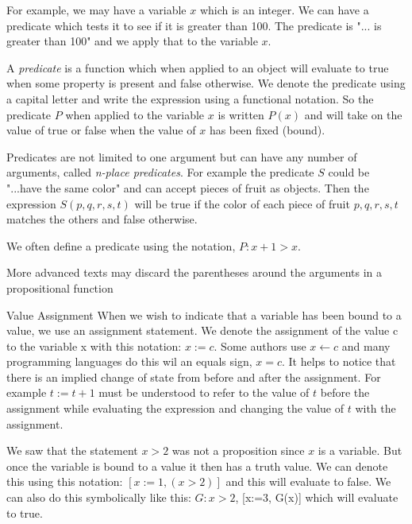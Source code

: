 For example, we may have a variable $x$ which is an integer. We can have a predicate which tests it to see if it is greater than 100. The predicate is "... is greater than 100" and we apply that to the variable $x$.

\begin{definition}[Predicate]
A \textit{predicate} is a function which when applied to an object will evaluate to true when some property is present and false otherwise. We denote the predicate using a capital letter and write the expression using a functional notation. So the predicate $P$ when applied to the variable $x$ is written $P(x)$ and will take on the value of true or false when the value of $x$ has been fixed (bound).

Predicates are not limited to one argument but can have any number of arguments, called \textit{n-place predicates}. For example the predicate $S$ could be "...have the same color" and can accept pieces of fruit as objects. Then the expression $S(p,q,r,s,t)$ will be true if the color of each piece of fruit $p,q,r,s,t$ matches the others and false otherwise.

We often define a predicate using the notation, $P: x+1 > x$.
\end{definition}

\begin{notes}
More advanced texts may discard the parentheses around the arguments in a propositional function
\end{notes}

\begin{definition}{Value Assignment}
When we wish to indicate that a variable has been bound to a value, we use an assignment statement. We denote the assignment of the value c to the variable x with this notation: $x := c$. Some authors use $x\leftarrow c$ and many programming languages do this wil an equals sign, $x=c$. It helps to notice that there is an implied change of state from before and after the assignment. For example $t:=t+1$ must be understood to refer to the value of $t$ before the assignment while evaluating the expression and changing the value of $t$ with the assignment.
\end{definition}

We saw that the statement $x>2$ was not a proposition since $x$ is a variable. But once the variable is bound to a value it then has a truth value. We can denote this using this notation:
$[x:=1, (x>2)]$ and this will evaluate to false. We can also do this symbolically like this: $G:x>2$, [x:=3, G(x)] which will evaluate to true.

